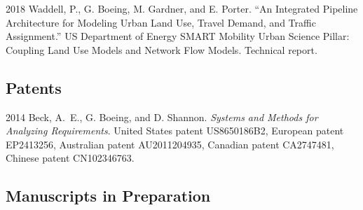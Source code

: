 \documentclass[12pt,letterpaper]{report}
\begin{document}
	\begin{tablist}
		
		\item[2018] \tab Waddell, P., G. Boeing, M. Gardner, and E. Porter. \enquote{An Integrated Pipeline Architecture for Modeling Urban Land Use, Travel Demand, and Traffic Assignment.} US Department of Energy SMART Mobility Urban Science Pillar: Coupling Land Use Models and Network Flow Models. Technical report.
		
	\end{tablist}
	
	
	
	\subsection*{Patents}
	
	\begin{tablist}
		
		\item[2014] \tab Beck, A.~E., G. Boeing, and D. Shannon. \textit{Systems and Methods for Analyzing Requirements}. United States patent US8650186B2, European patent EP2413256, Australian patent AU2011204935, Canadian patent CA2747481, Chinese patent CN102346763.
		
	\end{tablist}
	
	
	
	\subsection*{Manuscripts in Preparation}
	
\end{document}
